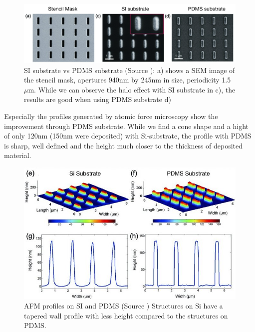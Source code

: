 \documentclass[journal, a4paper]{IEEEtran}
\begin{document}
\begin{figure}[hbt!]
\begin{center}
\includegraphics[width=\columnwidth]{06nogap.png}
\caption{SI substrate vs PDMS substrate (Source \cite{paper}): a) shows a SEM image of the stencil mask, apertures 940nm by 245nm in size, periodicity 1.5 $\mu$m. While we can observe the halo effect with SI substrate in c), the results are good when using PDMS substrate d)}
\label{fig:nogap}
\end{center}
\end{figure}

Especially the profiles generated by atomic force microscopy show the improvement through PDMS substrate. While we find a cone shape and a hight of only 120nm (150nm were deposited) with Si-substrate, the profile with PDMS is sharp, well defined and the height much closer to the thickness of deposited material.

\begin{figure}[hbt!]
\begin{center}
\includegraphics[width=\columnwidth]{07profiles.jpg}
\caption{AFM profiles on SI and PDMS (Source \cite{paper}) Structures on Si have a tapered wall profile with less height compared to the structures on PDMS.}
\label{fig:profiles}
\end{center}
\end{figure}
\end{document}
